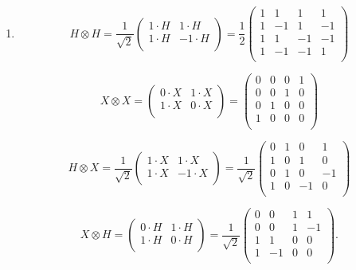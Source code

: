 \documentclass [12pt]{article}
\theoremstyle{definition}
\begin{document}
\begin{enumerate}
\item 
\[
H\otimes H=\frac{1}{\sqrt{2}}\left(\begin{array}{cc}
1\cdot H & 1\cdot H\\
1\cdot H & -1\cdot H\\
\end{array}\right)=
\frac{1}{2}\left(\begin{array}{cccc}
1 & 1 & 1 & 1 \\
1 & -1 & 1 & -1 \\
1 & 1 & -1 & -1 \\
1 & -1 & -1 & 1 \\
\end{array}\right)\]

\[
X\otimes X=\left(\begin{array}{cc}
0\cdot X & 1\cdot X\\
1\cdot X & 0\cdot X\\
\end{array}\right)=
\left(\begin{array}{cccc}
0 & 0 & 0 & 1 \\
0 & 0 & 1 & 0 \\
0 & 1 & 0 & 0 \\
1 & 0 & 0 & 0 \\
\end{array}\right)\]

\[
H\otimes X=\frac{1}{\sqrt{2}}\left(\begin{array}{cc}
1\cdot X & 1\cdot X\\
1\cdot X & -1\cdot X\\
\end{array}\right)=
\frac{1}{\sqrt{2}}\left(\begin{array}{cccc}
0 & 1 & 0 & 1 \\
1 & 0 & 1 & 0 \\
0 & 1 & 0 & -1 \\
1 & 0 & -1 & 0 \\
\end{array}\right)\]

\[
X\otimes H=\left(\begin{array}{cc}
0\cdot H & 1\cdot H\\
1\cdot H & 0\cdot H\\
\end{array}\right)=
\frac{1}{\sqrt{2}}\left(\begin{array}{cccc}
0 & 0 & 1 & 1 \\
0 & 0 & 1 & -1 \\
1 & 1 & 0 & 0 \\
1 & -1 & 0 & 0 \\
\end{array}\right).\]





\end{enumerate}
\end{document}

